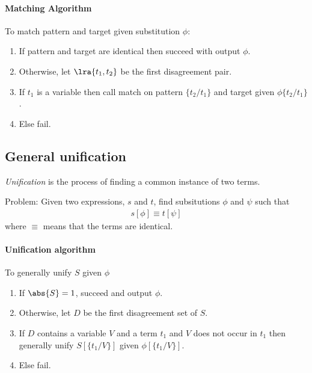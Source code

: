 \documentclass{article}
\begin{document}
\paragraph{Matching Algorithm}

To match pattern and target given substitution $\phi$:

\begin{enumerate}
	\item If pattern and target are identical then succeed with output $\phi$.
	\item Otherwise, let $\lra{t_1, t_2}$ be the first disagreement pair.
	\item If $t_1$ is a variable then call match on pattern $\{t_2/t_1\}$ and target given $\phi\{t_2/t_1\}$.
	\item Else fail.
\end{enumerate}

\subsection{General unification}

\begin{definition}
	\emph{Unification} is the process of finding a common instance of two terms.

	Problem: Given two expressions, $s$ and $t$, find subsitutions
	$\phi$ and $\psi$ such that
	\begin{align*}
		s[\phi] \equiv t[\psi]
	\end{align*}
	where $\equiv$ means that the terms are identical.
\end{definition}

\paragraph{Unification algorithm}

To generally unify $S$ given $\phi$
\begin{enumerate}
	\item If $\abs{S}=1$, succeed and output $\phi$.
	\item Otherwise, let $D$ be the first disagreement set of $S$.
	\item If $D$ contains a variable $V$ and a term $t_1$ and $V$
	      does not occur in $t_1$ then generally unify $S[\{t_1/V\}]$ given $\phi[\{t_1/V\}]$.
	\item Else fail.
\end{enumerate}
\end{document}
